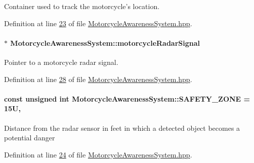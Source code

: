 Container used to track the motorcycle's location. 



Definition at line \hyperlink{MotorcycleAwarenessSystem_8hpp_source_l00023}{23} of file \hyperlink{MotorcycleAwarenessSystem_8hpp_source}{Motorcycle\-Awareness\-System.\-hpp}.

\hypertarget{classMotorcycleAwarenessSystem_a0744e71b9f440a86f5078c876ba7629b}{
\paragraph[{motorcycle\-Radar\-Signal}]{$\ast$ Motorcycle\-Awareness\-System\-::motorcycle\-Radar\-Signal\hspace{0.3cm}{\ttfamily [private]}}}\label{classMotorcycleAwarenessSystem_a0744e71b9f440a86f5078c876ba7629b}


Pointer to a motorcycle radar signal. 



Definition at line \hyperlink{MotorcycleAwarenessSystem_8hpp_source_l00028}{28} of file \hyperlink{MotorcycleAwarenessSystem_8hpp_source}{Motorcycle\-Awareness\-System.\-hpp}.

\hypertarget{classMotorcycleAwarenessSystem_a131c99d85b78020f94fe14bd397f3a6e}{
\paragraph[{S\-A\-F\-E\-T\-Y\-\_\-\-Z\-O\-N\-E}]{\setlength{\rightskip}{0pt plus 5cm}const unsigned int Motorcycle\-Awareness\-System\-::\-S\-A\-F\-E\-T\-Y\-\_\-\-Z\-O\-N\-E = 15\-U\hspace{0.3cm}{\ttfamily [static]}, {\ttfamily [private]}}}\label{classMotorcycleAwarenessSystem_a131c99d85b78020f94fe14bd397f3a6e}
Distance from the radar sensor in feet in which a detected object becomes a potential danger 

Definition at line \hyperlink{MotorcycleAwarenessSystem_8hpp_source_l00024}{24} of file \hyperlink{MotorcycleAwarenessSystem_8hpp_source}{Motorcycle\-Awareness\-System.\-hpp}.

